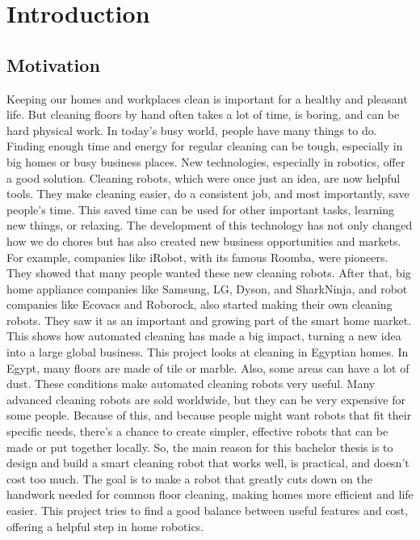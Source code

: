 \chapter{Introduction}
\label{chap:intro}

\section{Motivation}
\label{sec:motivation_intro}
Keeping our homes and workplaces clean is important for a healthy and pleasant life. But cleaning floors by hand often takes a lot of time, is boring, and can be hard physical work. In today's busy world, people have many things to do. Finding enough time and energy for regular cleaning can be tough, especially in big homes or busy business places. New technologies, especially in robotics, offer a good solution. Cleaning robots, which were once just an idea, are now helpful tools. They make cleaning easier, do a consistent job, and most importantly, save people's time. This saved time can be used for other important tasks, learning new things, or relaxing. The development of this technology has not only changed how we do chores but has also created new business opportunities and markets. For example, companies like iRobot, with its famous Roomba, were pioneers. They showed that many people wanted these new cleaning robots. After that, big home appliance companies like Samsung, LG, Dyson, and SharkNinja, and robot companies like Ecovacs and Roborock, also started making their own cleaning robots. They saw it as an important and growing part of the smart home market. This shows how automated cleaning has made a big impact, turning a new idea into a large global business.
This project looks at cleaning in Egyptian homes. In Egypt, many floors are made of tile or marble. Also, some areas can have a lot of dust. These conditions make automated cleaning robots very useful. Many advanced cleaning robots are sold worldwide, but they can be very expensive for some people. Because of this, and because people might want robots that fit their specific needs, there's a chance to create simpler, effective robots that can be made or put together locally. So, the main reason for this bachelor thesis is to design and build a smart cleaning robot that works well, is practical, and doesn't cost too much. The goal is to make a robot that greatly cuts down on the handwork needed for common floor cleaning, making homes more efficient and life easier. This project tries to find a good balance between useful features and cost, offering a helpful step in home robotics.

